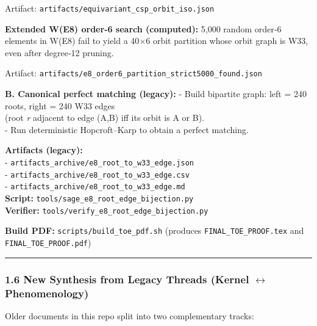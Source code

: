 \documentclass[11pt]{article}
\begin{document}
Artifact: \texttt{artifacts/equivariant\_csp\_orbit\_iso.json}

\textbf{Extended W(E8) order‑6 search (computed):} 5,000 random order‑6
elements in W(E8) fail to yield a 40\ensuremath{\times}6 orbit partition
whose orbit graph is W33, even after degree‑12 pruning.

Artifact:
\texttt{artifacts/e8\_order6\_partition\_strict5000\_found.json}

\textbf{B. Canonical perfect matching (legacy):} - Build bipartite
graph: left = 240 roots, right = 240 W33 edges\\
(root \emph{r} adjacent to edge (A,B) iff its orbit is A or B).\\
- Run deterministic Hopcroft--Karp to obtain a perfect matching.

\textbf{Artifacts (legacy):}\\
- \texttt{artifacts\_archive/e8\_root\_to\_w33\_edge.json}\\
- \texttt{artifacts\_archive/e8\_root\_to\_w33\_edge.csv}\\
- \texttt{artifacts\_archive/e8\_root\_to\_w33\_edge.md}\\
\textbf{Script:} \texttt{tools/sage\_e8\_root\_edge\_bijection.py}\\
\textbf{Verifier:} \texttt{tools/verify\_e8\_root\_edge\_bijection.py}

\textbf{Build PDF:} \texttt{scripts/build\_toe\_pdf.sh} (produces
\texttt{FINAL\_TOE\_PROOF.tex} and \texttt{FINAL\_TOE\_PROOF.pdf})

\begin{center}\rule{0.5\linewidth}{0.5pt}\end{center}

\subsubsection{\texorpdfstring{1.6 New Synthesis from Legacy Threads
(Kernel \ensuremath{\leftrightarrow}
Phenomenology)}{1.6 New Synthesis from Legacy Threads (Kernel  Phenomenology)}}\label{new-synthesis-from-legacy-threads-kernel-phenomenology}

Older documents in this repo split into two complementary tracks:
\end{document}
